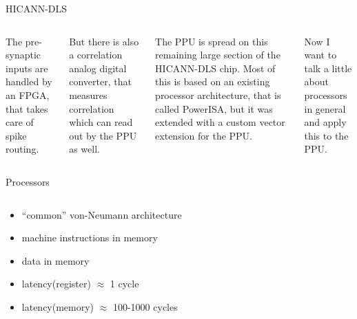 \documentclass[10pt,aspectratio=169]{beamer}
\begin{document}
\begin{frame}{HICANN-DLS}
\begin{columns}[c]
{        The pre-synaptic inputs are handled by an FPGA, that takes care of spike routing.
        
        But there is also a correlation analog digital converter, that measures correlation which can read out by the PPU as well. 

        The PPU is spread on this remaining large section of the HICANN-DLS chip.
		Most of this is based on an existing processor architecture, that is called PowerISA, but it was extended with a custom vector extension for the PPU.

		Now I want to talk a little about processors in general and apply this to the PPU.
}
    \end{columns}
\end{frame}

\begin{frame}{Processors}
    \begin{columns}[c]
    \begin{column}{0.5\textwidth}
		\begin{itemize}[<1->]
			\setlength\itemsep{1em}
            \item ``common'' von-Neumann architecture
			\item machine instructions in memory
			\item data in memory
            \item<2-> latency(register) $\approx$ 1 cycle
			\item<2-> latency(memory) $\approx$ 100-1000 cycles
		\end{itemize}
    \end{column}


\end{columns}
\end{frame}
\end{document}

